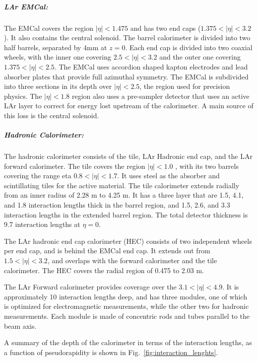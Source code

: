 \subparagraph{LAr EMCal: }
The EMCal covers the region $|\eta| < 1.475$ and has two end caps ($1.375 < |\eta| < 3.2$).
It also contains the central solenoid.
The barrel calorimeter is divided into two half barrels, separated by 4mm at $z = 0$.
Each end cap is divided into two coaxial wheels, with the inner one covering $2.5 < |\eta| < 3.2$ and the outer one covering  $1.375 < |\eta| < 2.5$.
The EMCal uses accordion shaped kapton electrodes and lead absorber plates that provide full azimuthal symmetry.
The EMCal is subdivided into three sections in its depth over $|\eta| < 2.5$, the region used for precision physics.
The $|\eta| < 1.8$ region also uses a pre-sampler detector that uses an active LAr layer to correct for energy lost upstream of the calorimeter.
A main source of this loss is the central solenoid.

\subparagraph{Hadronic Calorimeter: }
The hadronic calorimeter consists of the tile, LAr Hadronic end cap, and the LAr forward calorimeter.
The tile covers the region $|\eta| < 1.0$ , with its two barrels covering the range eta $0.8 < |\eta| < 1.7$.
It uses steel as the absorber and scintillating tiles for the active material.
The tile calorimeter extends radially from an inner radius of 2.28 m to 4.25 m.
It has a three layer that are 1.5, 4.1, and 1.8 interaction lengths thick in the barrel region, and 1.5, 2.6, and 3.3 interaction lengths in the extended barrel region.
The total detector thickness is 9.7 interaction lengths at $\eta = 0$.

The LAr hadronic end cap calorimeter (HEC) consists of two independent wheels per end cap, and is behind the EMCal end cap.
It extends out from $1.5 < |\eta| < 3.2$, and overlaps with the forward calorimeter and the tile calorimeter.
The HEC covers the radial region of 0.475 to 2.03 m.

The LAr Forward calorimeter provides coverage over the $3.1 < |\eta| < 4.9$.
It is approximately 10 interaction lengths deep, and has three modules, one of which is optimized for electromagnetic measurements, while the other two for hadronic measurements.
Each module is made of concentric rods and tubes parallel to the beam axis.

A summary of the depth of the calorimeter in terms of the interaction lengths, as a function of pseudorapidity is shown in Fig.~\ref{fig:interaction_lenghts}.

